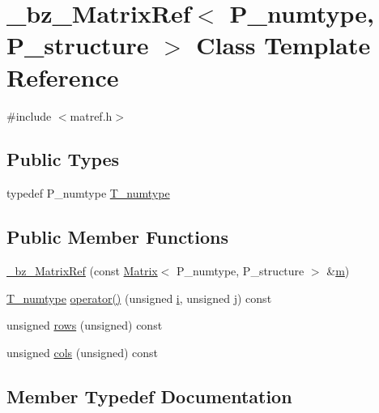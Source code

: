 \hypertarget{class__bz__MatrixRef}{}\section{\+\_\+bz\+\_\+\+Matrix\+Ref$<$ P\+\_\+numtype, P\+\_\+structure $>$ Class Template Reference}
\label{class__bz__MatrixRef}


{\ttfamily \#include $<$matref.\+h$>$}

\subsection*{Public Types}
\begin{DoxyCompactItemize}
\item 
typedef P\+\_\+numtype \hyperlink{class__bz__MatrixRef_ab5c7e3788a0cca8969748cec08c9557a}{T\+\_\+numtype}
\end{DoxyCompactItemize}
\subsection*{Public Member Functions}
\begin{DoxyCompactItemize}
\item 
\hyperlink{class__bz__MatrixRef_ac2fcd11d222b4df9a4f80fb10e6bb1f5}{\+\_\+bz\+\_\+\+Matrix\+Ref} (const \hyperlink{classMatrix}{Matrix}$<$ P\+\_\+numtype, P\+\_\+structure $>$ \&\hyperlink{indexexpr_8h_ab72fdb4031d47b75ab26dd18a437bcdc}{m})
\item 
\hyperlink{class__bz__MatrixRef_ab5c7e3788a0cca8969748cec08c9557a}{T\+\_\+numtype} \hyperlink{class__bz__MatrixRef_a692b306fe0f1ce0aba1369d767912399}{operator()} (unsigned \hyperlink{indexexpr_8h_aabd77643995707c185e95c8cb2782c81}{i}, unsigned \hyperlink{indexexpr_8h_aa1f3325d66516548e69238097857fa98}{j}) const 
\item 
unsigned \hyperlink{class__bz__MatrixRef_a97219b39af00528b43f6cdf6832682ad}{rows} (unsigned) const 
\item 
unsigned \hyperlink{class__bz__MatrixRef_a27141da4e4912300af2596d94593a66d}{cols} (unsigned) const 
\end{DoxyCompactItemize}


\subsection{Member Typedef Documentation}
\hypertarget{class__bz__MatrixRef_ab5c7e3788a0cca8969748cec08c9557a}{}
